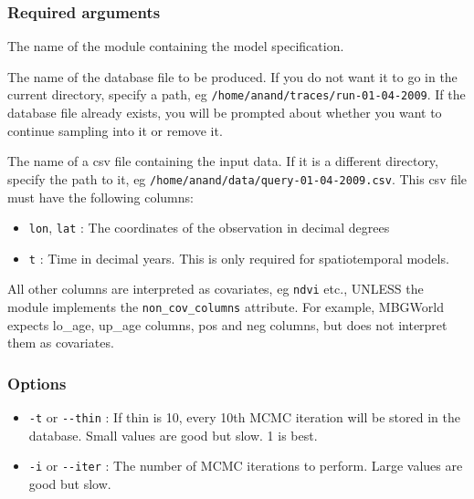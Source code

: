 \subsubsection{Required arguments%
}
\begin{list}{.}
{
\setlength{\rightmargin}{\leftmargin}
}

\item The name of the module containing the model specification.

\item The name of the database file to be produced. If you do not want it to go in the current
directory, specify a path, eg \texttt{/home/anand/traces/run-01-04-2009}. If the database file
already exists, you will be prompted about whether you want to continue sampling into it
or remove it.

\item The name of a csv file containing the input data. If it is a different directory, specify
the path to it, eg \texttt{/home/anand/data/query-01-04-2009.csv}. This csv file must have the
following columns:
%
\begin{itemize}

\item \texttt{lon}, \texttt{lat} : The coordinates of the observation in decimal degrees

\item \texttt{t} : Time in decimal years. This is only required for spatiotemporal models.

\end{itemize}

All other columns are interpreted as covariates, eg \texttt{ndvi} etc., UNLESS the module
implements the \texttt{non\_cov\_columns} attribute. For example, MBGWorld expects
lo\_age, up\_age columns, pos and neg columns, but does not interpret them as covariates.
\end{list}




\subsubsection{Options%
}
%
\begin{itemize}

\item \texttt{-t} or \texttt{-{}-thin} : If thin is 10, every 10th MCMC iteration will be stored in the
database. Small values are good but slow. 1 is best.

\item \texttt{-i} or \texttt{-{}-iter} : The number of MCMC iterations to perform. Large values are good
but slow.

\end{itemize}

